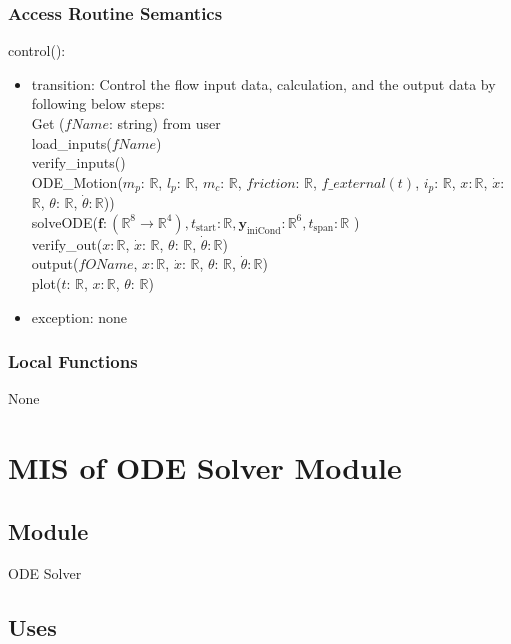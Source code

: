 \documentclass[12pt, titlepage]{article}
\begin{document}
\subsubsection{Access Routine Semantics}

\noindent control():
\begin{itemize}
\item transition: Control the flow input data, calculation, and the output data by following below steps: \\
\noindent Get ($fName$: string) from user\\
\noindent load\_inputs($fName$)\\
\noindent verify\_inputs()\\
\noindent ODE\_Motion($ m_p$: $\mathbb{R}$, $l_p$: $\mathbb{R}$, $m_c$: $\mathbb{R}$, $friction$: $\mathbb{R}$, $f\_external(t)$, $i_p$: $\mathbb{R}$, $x$$: \mathbb{R}$, $\dot{x}$: $\mathbb{R}$, $\theta$: $\mathbb{R}$, $\dot{\theta}$$: \mathbb{R}$))\\
\noindent solveODE($\textbf{f}: (\mathbb{R}^{8} \rightarrow \mathbb{R}^4),  t_\text{start}: \mathbb{R}, \textbf{y}_\text{iniCond}: \mathbb{R}^6, t_\text{span}: \mathbb{R}$ )\\
\noindent verify\_out($x$$: \mathbb{R}$, $\dot{x}$: $\mathbb{R}$, $\theta$: $\mathbb{R}$, $\dot{\theta}$$: \mathbb{R}$)\\
\noindent output($fOName$, $x$$: \mathbb{R}$, $\dot{x}$: $\mathbb{R}$, $\theta$: $\mathbb{R}$, $\dot{\theta}$$: \mathbb{R}$)\\
\noindent plot($t$: $\mathbb{R}$, $x$$: \mathbb{R}$, $\theta$: $\mathbb{R}$)\\
\item exception: none
\end{itemize}

\subsubsection{Local Functions}
None


\newpage

\section{MIS of ODE Solver Module \label{MODE}}

\subsection{Module}
ODE Solver
\subsection{Uses}
\end{document}
